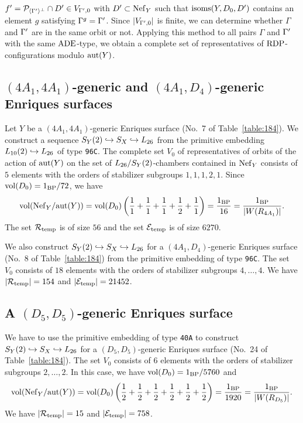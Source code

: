 \documentclass{amsart}
\numberwithin{procedure}{section}
\begin{document}
$f\sp\prime =\mathord{\mathcal P}_{\langle {\Gamma\sp\prime} \rangle\sp{\perp}}\cap D\sp\prime \in V_{\Gamma\sp\prime,0}$
with $D\sp\prime\subset\mathord{\rm Nef}_{Y}$ 
such that  $\mathord{\rm isoms}(Y, D_0, D\sp\prime)$ contains an element $g$ 
satisfying  $\Gamma^g=\Gamma\sp\prime$.
Since $|V_{\Gamma\sp\prime,0}|$ is finite,
we can determine whether 
$\Gamma$ and $\Gamma\sp\prime$
are in the same orbit or not.
Applying this method to all pairs $\Gamma$ and $\Gamma\sp\prime$
with the same $\mathord{\rm ADE}$-type,
we obtain a complete set of representatives of $\mathord{\rm RDP}$-configurations
modulo $\mathord{\rm{aut}}(Y)$.
%
\subsection{$(4A_1, 4A_1)$-generic and $(4A_1, D_4)$-generic Enriques surfaces}
%
Let $Y$ be a $(4A_1, 4A_1)$-generic Enriques surface (No.~7 of Table~\ref{table:184}).
We construct a sequence $S_{Y}(2)\hookrightarrow S_{X}\hookrightarrow L_{26}$
from the primitive embedding $L_{10}(2)\hookrightarrow L_{26}$ of type {\tt 96C}.
The complete set $V_0$ of representatives 
of orbits of the action of $\mathord{\rm{aut}}(Y)$ on 
the set of $L_{26}/S_Y(2)$-chambers contained in $\mathord{\rm Nef}_{Y}$ consists of $5$ elements
with the orders of stabilizer subgroups $1,1,1,2,1$. 
Since $\mathord{\rm{vol}}(D_0)=1_{\mathord{\rm{BP}}}/72$, we have 
\[
\mathord{\rm{vol}}(\mathord{\rm Nef}_{Y}/\mathord{\rm{aut}}(Y))=
\mathord{\rm{vol}}(D_0)\left(\frac{1}{1}+\frac{1}{1}+\frac{1}{1}+\frac{1}{2}+\frac{1}{1} \right)
=\frac{1_{\mathord{\rm{BP}}}}{16}=\frac{1_{\mathord{\rm{BP}}}}{|W(R_{4A_1})|}.
\]
The set $\mathord{\mathcal R}_{\mathord{\rm temp}}$ is of size $56$ and 
the set $\mathord{\mathcal E}_{\mathord{\rm temp}}$ is  of size $6270$.
%
\par 
%
We also construct  $S_{Y}(2)\hookrightarrow S_{X}\hookrightarrow L_{26}$
for  a $(4A_1, D_4)$-generic Enriques surface (No.~8 of Table~\ref{table:184})
from the primitive embedding  of type {\tt 96C}.
The set $V_0$  consists of $18$ elements
with the orders of stabilizer subgroups $4, \dots, 4$.
We have  $|\mathord{\mathcal R}_{\mathord{\rm temp}}|=154$ and 
 $|\mathord{\mathcal E}_{\mathord{\rm temp}}|=21452$.
%
\subsection{A $(D_5, D_5)$-generic  Enriques surface}
%
We have to use the primitive embedding  of type {\tt 40A}
to construct  $S_{Y}(2)\hookrightarrow S_{X}\hookrightarrow L_{26}$
for  a $(D_5, D_5)$-generic Enriques surface (No.~24 of Table~\ref{table:184}).
The set $V_0$  consists of $6$ elements
with the orders of stabilizer subgroups $2, \dots, 2$.
In this case,  we have $\mathord{\rm{vol}}(D_0)=1_{\mathord{\rm{BP}}}/5760$ and 
\[
\mathord{\rm{vol}}(\mathord{\rm Nef}_{Y}/\mathord{\rm{aut}}(Y))=
\mathord{\rm{vol}}(D_0)\left(\frac{1}{2}+\frac{1}{2}+\frac{1}{2}+\frac{1}{2}+\frac{1}{2}+\frac{1}{2} \right)
=\frac{1_{\mathord{\rm{BP}}}}{1920}=\frac{1_{\mathord{\rm{BP}}}}{|W(R_{D_5})|}.
\]
We have  $|\mathord{\mathcal R}_{\mathord{\rm temp}}|=15$ and 
 $|\mathord{\mathcal E}_{\mathord{\rm temp}}|=758$.
%
%
%
\end{document}
